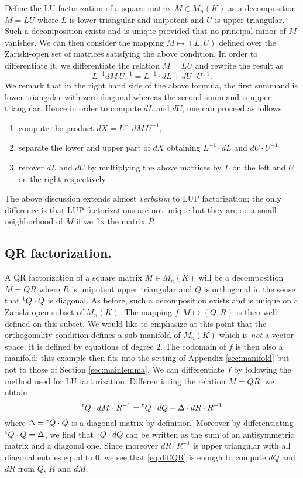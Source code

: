 \documentclass{sig-alternate}
\begin{document}
{Define the LU factorization of a square matrix $M \in M_n(K)$ as a decomposition $M = LU$ 
where $L$ is lower triangular and unipotent and $U$ is upper triangular. 
Such a decomposition exists and is unique provided that no principal minor
of $M$ vanishes. We can then consider the mapping $M \mapsto (L,U)$ 
defined over the Zariski-open set of matrices satisfying the above 
condition. In order to differentiate it, we differentiate the relation 
$M = LU$ and rewrite the result as
$$L^{-1} dM \: U^{-1} = L^{-1} \cdot dL + dU \cdot U^{-1}.$$
We remark that in the right hand side of the above formula, the first
summand is lower triangular with zero diagonal whereas 
the second summand is upper triangular. Hence in order to compute $dL$
and $dU$, one can proceed as follows: 
\begin{enumerate}
\item compute the product $dX = L^{-1} dM \: U^{-1}$,
\item separate the lower and upper part of $dX$ obtaining $L^{-1} \cdot dL$ and $dU \cdot U^{-1}$
\item recover $dL$ and $dU$ by multiplying the above matrices by $L$ on the left and $U$ on the right respectively.
\end{enumerate}
The above discussion extends almost \emph{verbatim} to LUP 
factorization; the only difference is that LUP factorizations are not 
unique but they are on a small neighborhood of $M$ if we fix the matrix 
$P$.

\subsection*{QR factorization.}

A QR factorization of a square matrix $M \in M_n(K)$ will be
a decomposition $M = QR$ where $R$ is unipotent upper triangular and $Q$ is
orthogonal in the sense that ${}^{\text t} Q \cdot Q$ is diagonal. As before, such 
a decomposition exists and is unique on a Zariski-open subset of $M_n(K)$. The
mapping $f : M \mapsto (Q,R)$ is then well defined on this subset. We 
would like to emphasize at this point that the orthogonality condition
defines a sub-manifold of $M_n(K)$ which is \emph{not} a
vector space: it is defined by equations of degree $2$. The codomain
of $f$ is then also a manifold; this example then fits into the setting
of Appendix \ref{sec:manifold} but not to those of Section \ref{sec:mainlemma}. 
We can differentiate $f$ by following the method used for LU 
factorization.  Differentiating the relation $M = QR$, we obtain
\begin{equation}
\label{eq:diffQR}
{}^{\text t} Q \cdot dM \cdot R^{-1} = {}^{\text t} Q \cdot dQ + \Delta \cdot dR 
\cdot R^{-1}
\end{equation}
where $\Delta = {}^{\text t} Q \cdot Q$ is a diagonal matrix by definition.
Moreover by differentiating ${}^{\text t} Q \cdot Q = \Delta$, we find that
${}^{\text t} Q \cdot dQ$ can be written as the sum of an antisymmetric 
matrix and a diagonal one. Since moreover $dR \cdot R^{-1}$ is upper
triangular with all diagonal entries equal to $0$, we see that 
\eqref{eq:diffQR} is enough to compute $dQ$ and $dR$ from $Q$, $R$ 
and $dM$.

}
\end{document}
